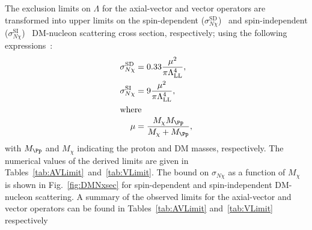 The exclusion limits on $\Lambda$ for the axial-vector and vector operators are transformed into upper limits on
the spin-dependent ($\sigma^\mathrm{SD}_{N\chi}$)~\cite{Super-Kamiokande,
  IceCube, COUPP, SIMPLE, Amole:2015lsj, Archambault:2012pm, Aprile:2013doa} and spin-independent
($\sigma^\mathrm{SI}_{N\chi}$)~\cite{SIMPLE, COUPP, CDMS-II, SuperCDMS, XENON100, LUX, Angloher:2014myn, Angloher:2015ewa}
DM-nucleon scattering cross section, respectively; using the following
expressions~\cite{PhysRevD.85.056011}:
\begin{align}
\sigma_{N\chi}^\mathrm{SD}  & =  0.33 \frac{\mu^{2}}{\pi\Lambda_\mathrm{LL}^{4}}, \\
\sigma_{N\chi}^\mathrm{SI}  & =  9 \frac{\mu^2}{\pi\Lambda_\mathrm{LL}^{4}},\\
\intertext{where}
\mu &= \frac{M_{\chi}M_{\Pp}}{M_{\chi}+M_{\Pp}},
\end{align}
with $M_{\Pp}$ and $M_\chi$ indicating the proton and
DM masses, respectively. The numerical values of the derived limits
are given in Tables~\ref{tab:AVLimit}~and~\ref{tab:VLimit}.  The
bound on $\sigma_{N\chi}$ as a function of $M_\chi$ is shown
in Fig.~\ref{fig:DMNxsec} for spin-dependent and spin-independent
DM-nucleon scattering. A summary of the observed limits for the axial-vector and vector operators can be found in Tables~\ref{tab:AVLimit} and~\ref{tab:VLimit} respectively

